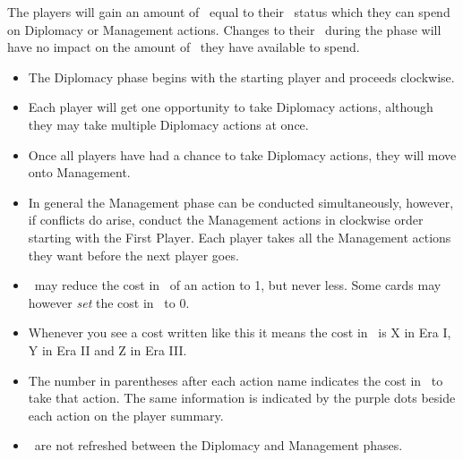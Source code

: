 \documentclass[10pt,twocolumn]{article}
\begin{document}
The players will gain an amount of \polfs\ equal to their \pol\ status which they can spend on Diplomacy or Management actions. Changes to their \pol\ during the phase will have no impact on the amount of \polfs\ they have available to spend.
\begin{itemize}
\item The Diplomacy phase begins with the starting player and proceeds clockwise.
\item Each player will get one opportunity to take Diplomacy actions, although they may take multiple Diplomacy actions at once.
\item Once all players have had a chance to take Diplomacy actions, they will move onto Management.
\item In general the Management phase can be conducted simultaneously, however, if conflicts do arise, conduct the Management actions in clockwise order starting with the First Player. Each player takes all the Management actions they want before the next player goes.
\item \landcards\ may reduce the cost in \polfs\ of an action to 1, but never less. Some cards may however \textit{set} the cost in \polfs\ to 0.
\item Whenever you see a cost written like this  it means the cost in \goods\ is X in Era I, Y in Era II and Z in Era III.
\item The number in parentheses after each action name indicates the cost in \polfs\ to take that action. The same information is indicated by the purple dots beside each action on the player summary.
\item \polfs\ are not refreshed between the Diplomacy and Management phases.
\end{itemize}
\end{document}

